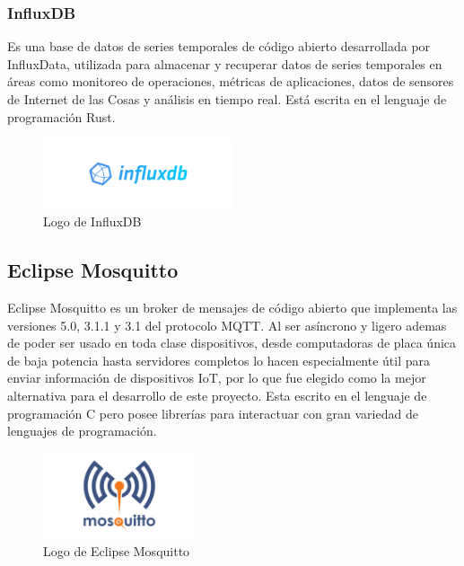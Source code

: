 \subsubsection{InfluxDB}
Es una base de datos de series temporales de código abierto desarrollada por InfluxData, utilizada para almacenar y recuperar datos de series temporales en áreas como monitoreo de operaciones, métricas de aplicaciones, datos de sensores de Internet de las Cosas y análisis en tiempo real. Está escrita en el lenguaje de programación Rust.

\begin{figure}[ht]
\vspace*{-15pt}
\centering
\includegraphics[width=0.5\textwidth]{Figuras/Influxdb_logo.png}
\caption{\label{fig:influxdb-logo}Logo de InfluxDB}
\vspace*{-10pt}
\end{figure}

\subsection{Eclipse Mosquitto}
Eclipse Mosquitto es un broker de mensajes de código abierto que implementa las versiones 5.0, 3.1.1 y 3.1 del protocolo MQTT. Al ser asíncrono y ligero ademas de poder ser usado en toda clase dispositivos, desde computadoras de placa única de baja potencia hasta servidores completos lo hacen especialmente útil para enviar información de dispositivos IoT, por lo que fue elegido como la mejor alternativa para el desarrollo de este proyecto. Esta escrito en el lenguaje de programación C pero posee librerías para interactuar con gran variedad de lenguajes de programación. 

\begin{figure}[ht]
\centering
\includegraphics[width=0.4\textwidth]{Figuras/mosquitto_logo.png}
\caption{\label{fig:mosquitto-logo}Logo de Eclipse Mosquitto}
\vspace*{-10pt}
\end{figure}

